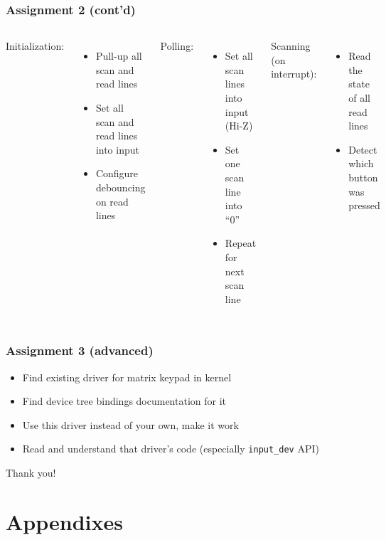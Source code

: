 \documentclass[aspectratio=169,usenames,dvipsnames]{beamer}
\newcounter{cont}
\begin{document}
\begin{frame}
  \frametitle{Assignment 2 (cont'd)}
  \begin{columns}
      Initialization:
      \begin{itemize}
        \item Pull-up all scan and read lines
        \item Set all scan and read lines into input
        \item Configure debouncing on read lines
      \end{itemize}
      Polling:
      \begin{itemize}
        \item Set all scan lines into input (Hi-Z)
        \item Set one scan line into ``0''
        \item Repeat for next scan line
      \end{itemize}
      Scanning (on interrupt):
      \begin{itemize}
        \item Read the state of all read lines
        \item Detect which button was pressed
      \end{itemize}
  \end{columns}
\end{frame}

\begin{frame}
  \frametitle{Assignment 3 (advanced)}
  \begin{itemize}
    \item Find existing driver for matrix keypad in kernel
    \item Find device tree bindings documentation for it
    \item Use this driver instead of your own, make it work
    \item Read and understand that driver's code (especially
          \texttt{input\_dev} API)
  \end{itemize}
\end{frame}

\begin{frame}[standout]
  Thank you!
\end{frame}

\section{Appendixes}
\end{document}
